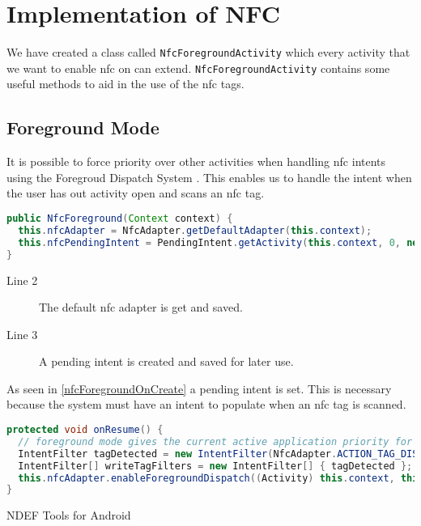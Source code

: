 \section{Implementation of NFC}
We have created a class called \lstinline|NfcForegroundActivity| which every activity that we want to enable \ac{nfc} on can extend. \lstinline|NfcForegroundActivity| contains some useful methods to aid in the use of the \ac{nfc} tags.

\subsection{Foreground Mode}
\label{sec:foeground}

It is possible to force priority over other activities when handling \ac{nfc} intents using the Foregroud Dispatch System \citep{foregroundDispatch}. This enables us to handle the intent when the user has out activity open and scans an \ac{nfc} tag.

\begin{lstlisting}[language=java, label=nfcForegroundOnCreate, caption=OnCreate]
public NfcForeground(Context context) { 
  this.nfcAdapter = NfcAdapter.getDefaultAdapter(this.context);
  this.nfcPendingIntent = PendingIntent.getActivity(this.context, 0, new Intent(this.context, ((Activity) this.context).getClass()).addFlags(Intent.FLAG_ACTIVITY_SINGLE_TOP), 0);
}
\end{lstlisting}
\begin{description}
\item[Line 2] The default \ac{nfc} adapter is get and saved.
\item[Line 3] A pending intent is created and saved for later use.
\end{description}
As seen in \autoref{nfcForegroundOnCreate} a pending intent is set. This is necessary because the system must have an intent to populate when an \ac{nfc} tag is scanned.

\begin{lstlisting}[language=java, caption=Foreground mode enabling]
protected void onResume() {
  // foreground mode gives the current active application priority for reading scanned tags
  IntentFilter tagDetected = new IntentFilter(NfcAdapter.ACTION_TAG_DISCOVERED); // filter for tags
  IntentFilter[] writeTagFilters = new IntentFilter[] { tagDetected };
  this.nfcAdapter.enableForegroundDispatch((Activity) this.context, this.nfcPendingIntent, writeTagFilters, null);
}
\end{lstlisting}




NDEF Tools for Android \citep{ndeftools}